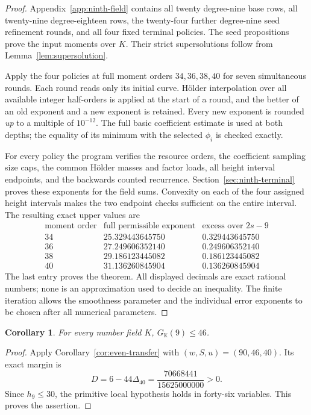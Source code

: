 \documentclass[11pt]{amsart}
\newtheorem{corollary}[theorem]{Corollary}
\theoremstyle{definition}
\numberwithin{equation}{section}
\begin{document}
\begin{proof}
Appendix~\ref{app:ninth-field} contains all twenty degree-nine base
rows, all twenty-nine degree-eighteen rows, the twenty-four further
degree-nine seed refinement rounds, and all four fixed terminal policies.
The seed propositions prove the input moments over $K$. Their
strict supersolutions follow from Lemma~\ref{lem:supersolution}.

Apply the four policies at full moment orders $34,36,38,40$ for seven
simultaneous rounds. Each round reads only its initial curve. H\"older
interpolation over all available integer half-orders is applied at the
start of a round, and the better of an old exponent and a new exponent
is retained. Every new exponent is rounded \emph{up} to a multiple of
$10^{-12}$. The full basic coefficient estimate is used at both depths;
the equality of its minimum with the selected $\phi_i$ is checked exactly.

For every policy the program verifies the resource orders, the coefficient
sampling size caps, the common H\"older masses and factor loads, all
height interval endpoints, and the backwards counted recurrence.
Section~\ref{sec:ninth-terminal} proves these exponents for the field
sums. Convexity on each of the four assigned height intervals makes
the two endpoint checks sufficient on the entire interval.
The resulting exact upper values are
\[
\begin{array}{c|c|c}
 \text{moment order}&\text{full permissible exponent}&\text{excess over }2s-9\\\hline
 34&25.329443645750&0.329443645750\\
 36&27.249606352140&0.249606352140\\
 38&29.186123445082&0.186123445082\\
 40&31.136260845904&0.136260845904
\end{array}
\]
The last entry proves the theorem. All displayed decimals are exact
rational numbers; none is an approximation used to decide an inequality.
The finite iteration allows the smoothness parameter and the individual
error exponents to be chosen after all numerical parameters.
\end{proof}


\begin{corollary}\label{thm:ninth-transfer}
For every number field $K$, $G_{\mathbb K}(9)\le46$.
\end{corollary}
\begin{proof}
Apply Corollary~\ref{cor:even-transfer} with $(w,S,u)=(90,46,40)$.
Its exact margin is
\[
 D=6-44\Delta_{40}=\frac{70668441}{15625000000}>0.
\]
Since $h_9\le30$, the primitive local hypothesis holds in
forty-six variables. This proves the assertion.
\end{proof}
\end{document}
